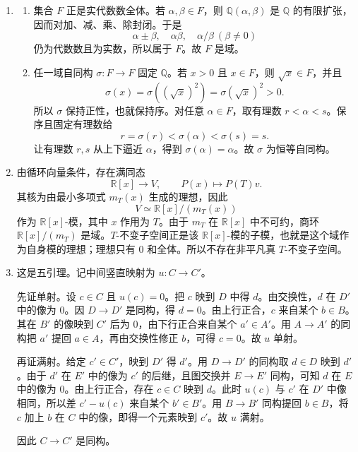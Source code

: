 \documentclass[UTF8,12pt]{ctexart}
\begin{document}
\begin{enumerate}[label=\textbf{\arabic*.},leftmargin=2.2em]
\item
\begin{enumerate}[label=\textbf{(\arabic*)},leftmargin=2.4em]
\item 集合 \(F\) 正是实代数数全体。若 \(\alpha,\beta\in F\)，则 \(\mathbb Q(\alpha,\beta)\) 是 \(\mathbb Q\) 的有限扩张，因而对加、减、乘、除封闭。于是
\[
\alpha\pm\beta,\quad \alpha\beta,\quad \alpha/\beta\ (\beta\ne0)
\]
仍为代数数且为实数，所以属于 \(F\)。故 \(F\) 是域。
\item 任一域自同构 \(\sigma:F\to F\) 固定 \(\mathbb Q\)。若 \(x>0\) 且 \(x\in F\)，则 \(\sqrt x\in F\)，并且
\[
\sigma(x)=\sigma((\sqrt x)^2)=\sigma(\sqrt x)^2>0.
\]
所以 \(\sigma\) 保持正性，也就保持序。对任意 \(\alpha\in F\)，取有理数 \(r<\alpha<s\)。保序且固定有理数给
\[
r=\sigma(r)<\sigma(\alpha)<\sigma(s)=s.
\]
让有理数 \(r,s\) 从上下逼近 \(\alpha\)，得到 \(\sigma(\alpha)=\alpha\)。故 \(\sigma\) 为恒等自同构。
\end{enumerate}

\item 由循环向量条件，存在满同态
\[
\mathbb R[x]\longrightarrow V,\qquad P(x)\mapsto P(T)v.
\]
其核为由最小多项式 \(m_T(x)\) 生成的理想，因此
\[
V\simeq \mathbb R[x]/(m_T(x))
\]
作为 \(\mathbb R[x]\)-模，其中 \(x\) 作用为 \(T\)。由于 \(m_T\) 在 \(\mathbb R[x]\) 中不可约，商环 \(\mathbb R[x]/(m_T)\) 是域。\(T\)-不变子空间正是该 \(\mathbb R[x]\)-模的子模，也就是这个域作为自身模的理想；理想只有 \(0\) 和全体。所以不存在非平凡真 \(T\)-不变子空间。

\item 这是五引理。记中间竖直映射为 \(u:C\to C'\)。

先证单射。设 \(c\in C\) 且 \(u(c)=0\)。把 \(c\) 映到 \(D\) 中得 \(d\)。由交换性，\(d\) 在 \(D'\) 中的像为 \(0\)。因 \(D\to D'\) 是同构，得 \(d=0\)。由上行正合，\(c\) 来自某个 \(b\in B\)。其在 \(B'\) 的像映到 \(C'\) 后为 \(0\)，由下行正合来自某个 \(a'\in A'\)。用 \(A\to A'\) 的同构把 \(a'\) 提回 \(a\in A\)，再由交换性修正 \(b\)，可得 \(c=0\)。故 \(u\) 单射。

再证满射。给定 \(c'\in C'\)，映到 \(D'\) 得 \(d'\)。用 \(D\to D'\) 的同构取 \(d\in D\) 映到 \(d'\)。由于 \(d'\) 在 \(E'\) 中的像为 \(c'\) 的后继，且图交换并 \(E\to E'\) 同构，可知 \(d\) 在 \(E\) 中的像为 \(0\)。由上行正合，存在 \(c\in C\) 映到 \(d\)。此时 \(u(c)\) 与 \(c'\) 在 \(D'\) 中像相同，所以差 \(c'-u(c)\) 来自某个 \(b'\in B'\)。用 \(B\to B'\) 同构提回 \(b\in B\)，将 \(c\) 加上 \(b\) 在 \(C\) 中的像，即得一个元素映到 \(c'\)。故 \(u\) 满射。

因此 \(C\to C'\) 是同构。


\end{enumerate}
\end{document}
